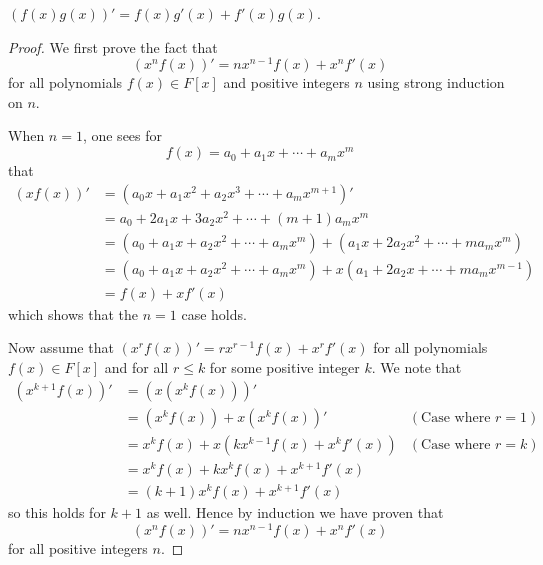 \begin{proposition}
    $(f(x)g(x))' = f(x)g'(x) + f'(x)g(x)$.
\end{proposition}
\begin{proof}
    We first prove the fact that
    \[
        (x^nf(x))' = nx^{n-1}f(x) + x^nf'(x)
    \]
    for all polynomials $f(x) \in F[x]$ and positive integers $n$ using strong induction on $n$.

    When $n = 1$, one sees for
    \[
        f(x) = a_0 + a_1x + \cdots + a_mx^m
    \]
    that
    \begin{align*}
        (xf(x))' &= \left(a_0x + a_1x^2 + a_2x^3 + \cdots + a_mx^{m+1}\right)'\\
        &= a_0 + 2a_1x + 3a_2x^2 + \cdots + (m+1)a_mx^m\\
        &= \left(a_0 + a_1x + a_2x^2 + \cdots + a_mx^m\right) + \left(a_1x + 2a_2x^2 + \cdots + ma_mx^m\right)\\
        &= \left(a_0 + a_1x + a_2x^2 + \cdots + a_mx^m\right) + x\left(a_1 + 2a_2x + \cdots + ma_mx^{m-1}\right)\\
        &= f(x) + xf'(x)
    \end{align*}
    which shows that the $n = 1$ case holds.

    Now assume that $(x^rf(x))' = rx^{r-1}f(x) + x^rf'(x)$ for all polynomials $f(x) \in F[x]$ and for all $r \leq k$ for some positive integer $k$. We note that
    \begin{align*}
        (x^{k+1}f(x))' &= \left(x\left(x^kf(x)\right)\right)'\\
        &= \left(x^kf(x)\right) + x\left(x^kf(x)\right)' & (\text{Case where }r=1)\\
        &= x^kf(x) + x\left(kx^{k-1}f(x) + x^kf'(x)\right) & (\text{Case where }r=k)\\
        &= x^kf(x) + kx^kf(x) + x^{k+1}f'(x)\\
        &= (k+1)x^kf(x) + x^{k+1}f'(x)
    \end{align*}
    so this holds for $k + 1$ as well. Hence by induction we have proven that
    \[
        (x^nf(x))' = nx^{n-1}f(x) + x^nf'(x)
    \]
    for all positive integers $n$.


\end{proof}
